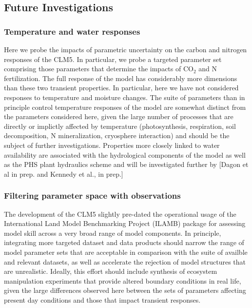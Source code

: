 \documentclass[draft,linenumbers]{agujournal}
\begin{document}
\subsection{Future Investigations}
\subsubsection{Temperature and water responses}
Here we probe the impacts of parametric uncertainty on the carbon and nitrogen responses of the CLM5. In particular, we probe a targeted parameter set comprising those parameters that determine the impacts of CO$_{2}$ and N fertilization. The full response of the model has considerably more dimensions than these two transient properties. In particular, here we have not considered responses to temperature and moisture changes. The suite of parameters than in principle control temperature responses of the model are somewhat distinct from the parameters considered here, given the large number of processes that are directly or implictly affected by temperature (photosynthesis, respiration, soil decomposition, N mineralization, cryosphere interaction) and should be the subject of further investigations. Properties more closely linked to water availability are associated with the hydrological components of the model as well as the PHS plant hydraulics scheme and will be investigated further by [Dagon et al in prep. and Kennedy et al., in prep.] 

\subsubsection{Filtering parameter space with observations}
The development of the CLM5 slightly pre-dated the operational usage of the International Land Model Benchmarking Project (ILAMB) package \cite{collier2016} for assessing model skill across a very broad range of model components.  In principle, integrating more targeted dataset and data products should narrow the range of model parameter sets that are acceptable in comparison with the suite of availble and relevant datasets, as well as accelerate the rejection of model structures that are unrealistic. Ideally, this effort should include synthesis of ecosystem manipulation experiments that provide altered boundary conditions in real life, given the large differences observed here between the sets of parameters affecting present day conditions and those that impact transient responses.
\end{document}
